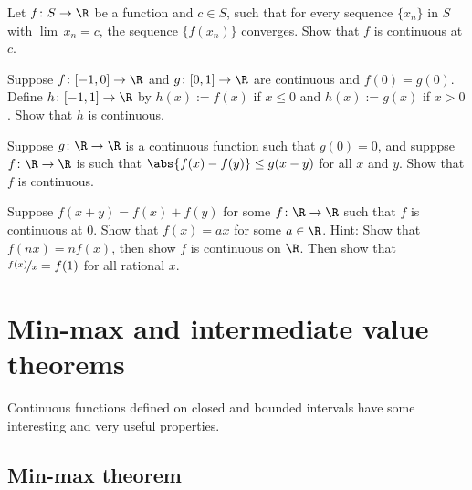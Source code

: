 \documentclass[12pt]{book}
\begin{document}
\begin{exercise} \label{exercise:contseqalt}
Let $f \colon S \to \R$ be a function and $c \in S$, such that for every
sequence $\{ x_n \}$ in $S$ with $\lim\, x_n = c$, the sequence
$\{ f(x_n) \}$ converges.
Show that $f$ is continuous at $c$.
\end{exercise}

\begin{exercise}
Suppose $f \colon [-1,0] \to \R$ and $g \colon [0,1] \to \R$ are continuous
and $f(0) = g(0)$.
Define $h \colon [-1,1] \to \R$ by 
$h(x) := f(x)$ if $x \leq 0$ and $h(x) := g(x)$ if $x > 0$.
Show that
$h$ is continuous.
\end{exercise}

\begin{exercise}
Suppose $g \colon \R \to \R$ is a continuous function such that $g(0) = 0$,
and supppse $f \colon \R \to \R$ is such that
$\abs{f(x)-f(y)} \leq g(x-y)$ for all $x$ and $y$.
Show that $f$ is
continuous.
\end{exercise}

\begin{exercise}[Challenging]
Suppose $f(x+y) = f(x) + f(y)$ for some $f \colon \R \to \R$
such that $f$ is continuous at 0.
Show that $f(x) = ax$ for some $a \in \R$.
Hint: Show that $f(nx) = nf(x)$, then show $f$ is continuous on $\R$.
Then show that $\nicefrac{f(x)}{x} = f(1)$ for all rational $x$.
\end{exercise}



\sectionnewpage
\section{Min-max and intermediate value theorems}
\label{sec:minmaxint}


Continuous functions defined on closed and bounded intervals
have some interesting and very useful properties.

\subsection*{Min-max theorem}
\end{document}
